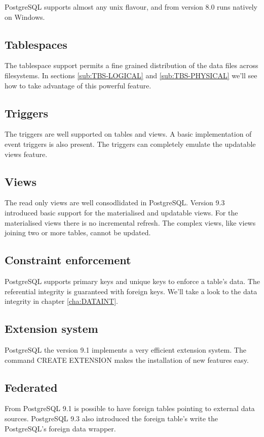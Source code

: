 PostgreSQL supports almost any unix flavour, and from version
8.0 runs natively on Windows.

\subsection{Tablespaces}

The tablespace support permits a fine grained distribution of the data files
across filesystems. In sections \ref{sub:TBS-LOGICAL} and
\ref{sub:TBS-PHYSICAL} we'll see how to take advantage of this powerful
feature.

\subsection{Triggers}

The triggers are well supported on tables and views. A basic implementation of
event triggers is also present. The triggers can completely emulate the
updatable views feature.

\subsection{Views}

The read only views are well consodlidated in PostgreSQL. Version 9.3
introduced basic support for the materialised and updatable views. For the
materialised views there is no incremental refresh. The complex views, like
views joining two or more tables, cannot be updated.

\subsection{Constraint enforcement}

PostgreSQL supports primary keys and unique keys to enforce a table's data. The
referential integrity is guaranteed with foreign keys. We'll take a look to the
data integrity in chapter \ref{cha:DATAINT}.

\subsection{Extension system}

PostgreSQL the version 9.1 implements a very efficient extension system. The
command CREATE EXTENSION makes the installation of new features easy.

\subsection{Federated}

From PostgreSQL 9.1 is possible to have foreign tables pointing to external
data sources. PostgreSQL 9.3 also introduced the foreign table's write the
PostgreSQL's foreign data wrapper.
